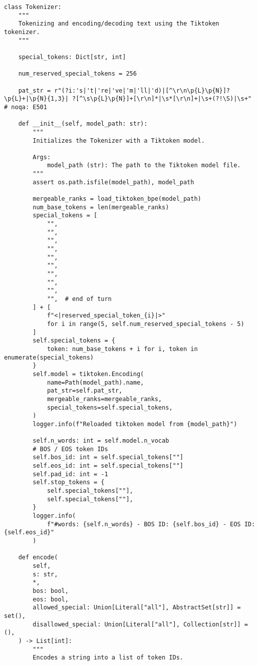 \begin{lstlisting}
class Tokenizer:
    """
    Tokenizing and encoding/decoding text using the Tiktoken tokenizer.
    """

    special_tokens: Dict[str, int]

    num_reserved_special_tokens = 256

    pat_str = r"(?i:'s|'t|'re|'ve|'m|'ll|'d)|[^\r\n\p{L}\p{N}]?\p{L}+|\p{N}{1,3}| ?[^\s\p{L}\p{N}]+[\r\n]*|\s*[\r\n]+|\s+(?!\S)|\s+"  # noqa: E501

    def __init__(self, model_path: str):
        """
        Initializes the Tokenizer with a Tiktoken model.

        Args:
            model_path (str): The path to the Tiktoken model file.
        """
        assert os.path.isfile(model_path), model_path

        mergeable_ranks = load_tiktoken_bpe(model_path)
        num_base_tokens = len(mergeable_ranks)
        special_tokens = [
            "",
            "",
            "",
            "",
            "",
            "",
            "",
            "",
            "",
            "",  # end of turn
        ] + [
            f"<|reserved_special_token_{i}|>"
            for i in range(5, self.num_reserved_special_tokens - 5)
        ]
        self.special_tokens = {
            token: num_base_tokens + i for i, token in enumerate(special_tokens)
        }
        self.model = tiktoken.Encoding(
            name=Path(model_path).name,
            pat_str=self.pat_str,
            mergeable_ranks=mergeable_ranks,
            special_tokens=self.special_tokens,
        )
        logger.info(f"Reloaded tiktoken model from {model_path}")

        self.n_words: int = self.model.n_vocab
        # BOS / EOS token IDs
        self.bos_id: int = self.special_tokens[""]
        self.eos_id: int = self.special_tokens[""]
        self.pad_id: int = -1
        self.stop_tokens = {
            self.special_tokens[""],
            self.special_tokens[""],
        }
        logger.info(
            f"#words: {self.n_words} - BOS ID: {self.bos_id} - EOS ID: {self.eos_id}"
        )

    def encode(
        self,
        s: str,
        *,
        bos: bool,
        eos: bool,
        allowed_special: Union[Literal["all"], AbstractSet[str]] = set(),
        disallowed_special: Union[Literal["all"], Collection[str]] = (),
    ) -> List[int]:
        """
        Encodes a string into a list of token IDs.


\end{lstlisting}
